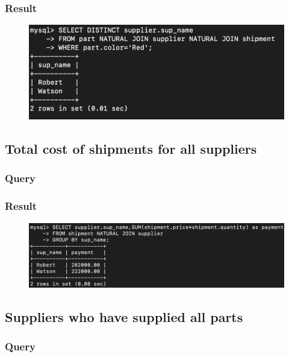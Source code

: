 \documentclass[12pt]{article}
\begin{document}
\subsubsection{Result}
\begin{figure}[!hbt]
    \centering
    \includegraphics[scale=1.0]{screenshots/5a.png}
    \label{fig:my_label1}
\end{figure}

\subsection{Total cost of shipments for all suppliers}

\subsubsection{Query}
\newpage
\subsubsection{Result}
\begin{figure}[!hbt]
    \centering
    \includegraphics[scale=0.5]{screenshots/5b.png}
    \label{fig:my_label1}
\end{figure}

\subsection{Suppliers who have supplied all parts}

\subsubsection{Query}
\end{document}
